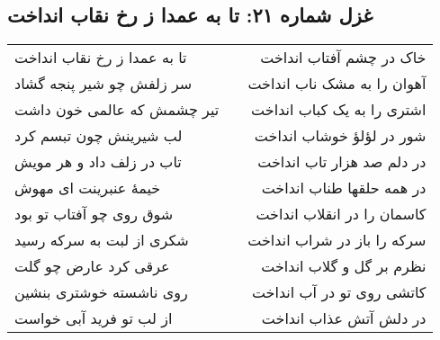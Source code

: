 \begin{center}
\section*{غزل شماره ۲۱: تا به عمدا ز رخ نقاب انداخت}
\label{sec:021}
\begin{longtable}{l p{0.5cm} r}
تا به عمدا ز رخ نقاب انداخت
&&
خاک در چشم آفتاب انداخت
\\
سر زلفش چو شیر پنجه گشاد
&&
آهوان را به مشک ناب انداخت
\\
تیر چشمش که عالمی خون داشت
&&
اشتری را به یک کباب انداخت
\\
لب شیرینش چون تبسم کرد
&&
شور در لؤلؤ خوشاب انداخت
\\
تاب در زلف داد و هر مویش
&&
در دلم صد هزار تاب انداخت
\\
خیمهٔ عنبرینت ای مهوش
&&
در همه حلقها طناب انداخت
\\
شوق روی چو آفتاب تو بود
&&
کاسمان را در انقلاب انداخت
\\
شکری از لبت به سرکه رسید
&&
سرکه را باز در شراب انداخت
\\
عرقی کرد عارض چو گلت
&&
نظرم بر گل و گلاب انداخت
\\
روی ناشسته خوشتری بنشین
&&
کاتشی روی تو در آب انداخت
\\
از لب تو فرید آبی خواست
&&
در دلش آتش عذاب انداخت
\\
\end{longtable}
\end{center}
